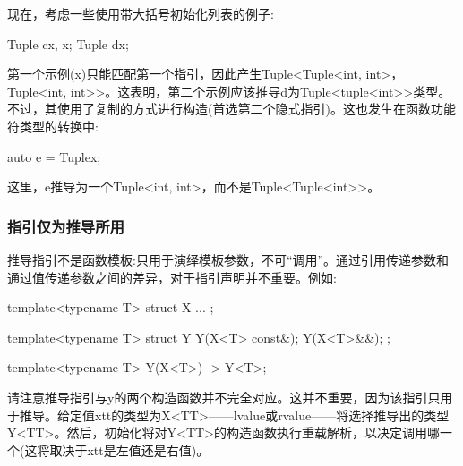 现在，考虑一些使用带大括号初始化列表的例子:

\begin{cpp}
Tuple c{x, x};
Tuple d{x};
\end{cpp}

第一个示例(x)只能匹配第一个指引，因此产生Tuple<Tuple<int, int>，Tuple<int, int>{}>。这表明，第二个示例应该推导d为Tuple<tuple<int>{}>类型。不过，其使用了复制的方式进行构造(首选第二个隐式指引)。这也发生在函数功能符类型的转换中:

\begin{cpp}
auto e = Tuple{x};
\end{cpp}

这里，e推导为一个Tuple<int, int>，而不是Tuple<Tuple<int>{}>。

\subsubsection{指引仅为推导所用}

推导指引不是函数模板:只用于演绎模板参数，不可“调用”。通过引用传递参数和通过值传递参数之间的差异，对于指引声明并不重要。例如:

\begin{cpp}
template<typename T> struct X {
	...
};

template<typename T> struct Y {
	Y(X<T> const&);
	Y(X<T>&&);
};

template<typename T> Y(X<T>) -> Y<T>;
\end{cpp}

请注意推导指引与y的两个构造函数并不完全对应。这并不重要，因为该指引只用于推导。给定值xtt的类型为X<TT>——lvalue或rvalue——将选择推导出的类型Y<TT>。然后，初始化将对Y<TT>的构造函数执行重载解析，以决定调用哪一个(这将取决于xtt是左值还是右值)。





